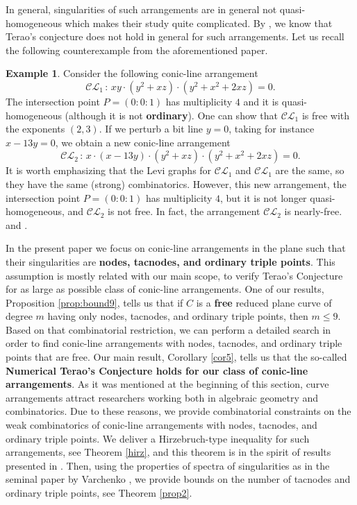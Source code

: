 \documentclass[12pt]{amsart}
\theoremstyle{plain}
\theoremstyle{definition}
\newtheorem{ex}[subsection]{Example}
\numberwithin{equation}{section}
\begin{document}
In general, singularities of such arrangements are in general not quasi-homogeneous which makes their study quite complicated.
By \cite[Example 4.1]{SchenckToh}, we know that Terao's conjecture does not hold in general for such arrangements. Let us recall the following counterexample from the aforementioned paper.
\begin{ex}
Consider the following conic-line arrangement
$$\mathcal{CL}_{1} \, : \, xy\cdot(y^{2} + xz)\cdot(y^{2}+x^{2} + 2xz)=0.$$
The intersection point $P = (0:0:1)$ has multiplicity $4$ and it is quasi-homogeneous (although it is not \textbf{ordinary}). One can show that $\mathcal{CL}_{1}$ is free with the exponents $(2,3)$. If we perturb a bit line $y=0$, taking for instance $x-13y = 0$, we obtain a new conic-line arrangement 
$$\mathcal{CL}_{2} \, : \, x\cdot(x-13y)\cdot(y^{2} + xz)\cdot(y^{2}+x^{2} + 2xz)=0.$$
It is worth emphasizing that the Levi graphs for $\mathcal{CL}_{1}$ and $\mathcal{CL}_{1}$ are the same, so they have the same (strong) combinatorics. However, this new arrangement, the intersection point $P=(0:0:1)$ has multiplicity $4$, but it is not longer quasi-homogeneous, and $\mathcal{CL}_{2}$ is not free. In fact, the arrangement $\mathcal{CL}_{2}$ is nearly-free.
\cite{DimcaSernesi} and \cite{STY}.
\end{ex}
In the present paper we focus on conic-line arrangements in the plane such that their singularities are \textbf{nodes, tacnodes, and ordinary triple points}. This assumption is mostly related with our main scope, to verify Terao's Conjecture for as large as possible class of conic-line arrangements.
 One of our results, Proposition \ref{prop:bound9}, tells us that if $C$ is a \textbf{free} reduced plane curve of degree $m$ having only nodes, tacnodes, and ordinary triple points, then $m\leq 9$. Based on that combinatorial restriction, we can perform a detailed search in order to find conic-line arrangements with nodes, tacnodes, and ordinary triple points that are free. Our main result, Corollary \ref{cor5}, tells us that the so-called \textbf{Numerical Terao's Conjecture holds for our class of conic-line arrangements}. As it was mentioned at the beginning of this section, curve arrangements attract researchers working both in algebraic geometry and combinatorics. Due to these reasons, we provide combinatorial constraints on the weak combinatorics of conic-line arrangements with nodes, tacnodes, and ordinary triple points. We deliver a Hirzebruch-type inequality for such arrangements, see Theorem \ref{hirz}, and this theorem is in the spirit of results presented in \cite{PokSz}. Then, using the properties of spectra of singularities as in the seminal paper by Varchenko \cite{V}, we provide bounds on the number of tacnodes and ordinary triple points, see Theorem \ref{prop2}.
\end{document}
